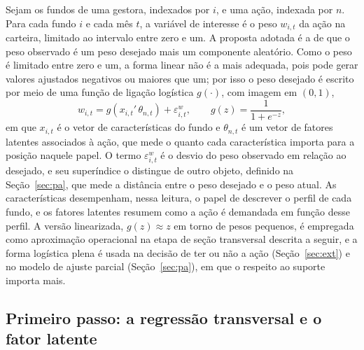 \documentclass[12pt,a4paper]{article}
\begin{document}
Sejam os fundos de uma gestora, indexados por $i$, e uma ação, indexada por $n$. Para cada fundo
$i$ e cada mês $t$, a variável de interesse é o peso $w_{i,t}$ da ação na carteira, limitado ao
intervalo entre zero e um. A proposta adotada é a de que o peso observado é um peso desejado
mais um componente aleatório. Como o peso é limitado entre zero e um, a forma linear não é a
mais adequada, pois pode gerar valores ajustados negativos ou maiores que um; por isso o peso
desejado é escrito por meio de uma função de ligação logística $g(\cdot)$, com imagem em $(0,1)$,
\begin{equation}
w_{i,t} = g\!\left(x_{i,t}'\,\theta_{n,t}\right) + \varepsilon^{w}_{i,t},
\qquad g(z)=\frac{1}{1+e^{-z}},
\label{eq:logit}
\end{equation}
em que $x_{i,t}$ é o vetor de características do fundo e $\theta_{n,t}$ é um vetor de fatores
latentes associados à ação, que mede o quanto cada característica importa para a posição naquele
papel. O termo $\varepsilon^{w}_{i,t}$ é o desvio do peso observado em relação ao desejado, e seu
superíndice o distingue de outro objeto, definido na Seção~\ref{sec:pa}, que mede a distância
entre o peso desejado e o peso atual. As características desempenham, nessa leitura, o papel de
descrever o perfil de cada fundo, e os fatores latentes resumem como a ação é demandada em
função desse perfil. A versão linearizada, $g(z)\approx z$ em torno de pesos pequenos, é
empregada como aproximação operacional na etapa de seção transversal descrita a seguir, e a
forma logística plena é usada na decisão de ter ou não a ação (Seção~\ref{sec:ext}) e no modelo
de ajuste parcial (Seção~\ref{sec:pa}), em que o respeito ao suporte importa mais.

\subsection{Primeiro passo: a regressão transversal e o fator latente}
\label{sec:cs}
\end{document}

